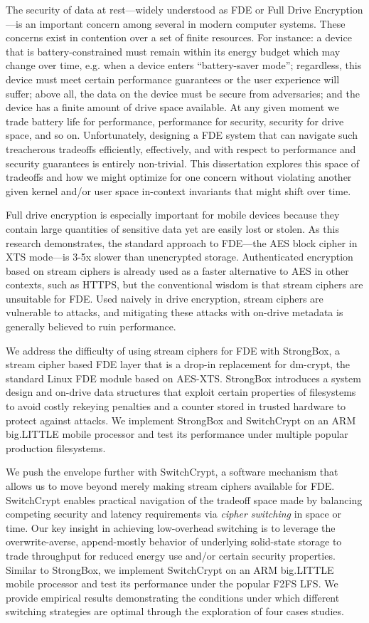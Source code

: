 \abstract
The security of data at rest---widely understood as FDE or Full Drive
Encryption---is an important concern among several in modern computer systems.
These concerns exist in contention over a set of finite resources. For instance:
a device that is battery-constrained must remain within its energy budget which
may change over time, e.g. when a device enters ``battery-saver mode'';
regardless, this device must meet certain performance guarantees or the user
experience will suffer; above all, the data on the device must be secure from
adversaries; and the device has a finite amount of drive space available. At any
given moment we trade battery life for performance, performance for security,
security for drive space, and so on. Unfortunately, designing a FDE system that
can navigate such treacherous tradeoffs efficiently, effectively, and with
respect to performance and security guarantees is entirely non-trivial. This
dissertation explores this space of tradeoffs and how we might optimize for one
concern without violating another given kernel and/or user space in-context
invariants that might shift over time.

Full drive encryption is especially important for mobile devices because they
contain large quantities of sensitive data yet are easily lost or stolen. As
this research demonstrates, the standard approach to FDE---the AES block cipher
in XTS mode---is 3-5x slower than unencrypted storage. Authenticated encryption
based on stream ciphers is already used as a faster alternative to AES in other
contexts, such as HTTPS, but the conventional wisdom is that stream ciphers are
unsuitable for FDE. Used naively in drive encryption, stream ciphers are
vulnerable to attacks, and mitigating these attacks with on-drive metadata is
generally believed to ruin performance.

We address the difficulty of using stream ciphers for FDE with StrongBox, a
stream cipher based FDE layer that is a drop-in replacement for dm-crypt, the
standard Linux FDE module based on AES-XTS. StrongBox introduces a system design
and on-drive data structures that exploit certain properties of filesystems to
avoid costly rekeying penalties and a counter stored in trusted hardware to
protect against attacks. We implement StrongBox and SwitchCrypt on an ARM
big.LITTLE mobile processor and test its performance under multiple popular
production filesystems.

We push the envelope further with SwitchCrypt, a software mechanism that allows
us to move beyond merely making stream ciphers available for FDE. SwitchCrypt
enables practical navigation of the tradeoff space made by balancing competing
security and latency requirements via \emph{cipher switching} in space or time.
Our key insight in achieving low-overhead switching is to leverage the
overwrite-averse, append-mostly behavior of underlying solid-state storage to
trade throughput for reduced energy use and/or certain security properties.
Similar to StrongBox, we implement SwitchCrypt on an ARM big.LITTLE mobile
processor and test its performance under the popular F2FS LFS. We provide
empirical results demonstrating the conditions under which different switching
strategies are optimal through the exploration of four cases studies.

